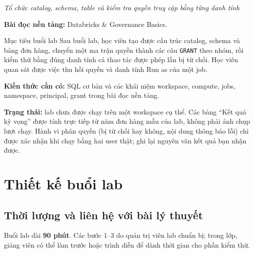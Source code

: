 
\begin{center}\large \emph{Tổ chức catalog, schema, table và kiểm tra quyền truy cập bằng từng danh tính}\end{center}

\textbf{Bài đọc nền tảng:} Databricks \& Governance Basics.


\begin{infobox}{Mục tiêu buổi lab}
Sau buổi lab, học viên tạo được cấu trúc catalog, schema và bảng đơn hàng, chuyển một ma trận quyền thành các câu \texttt{GRANT} theo nhóm, rồi kiểm thử bằng đúng danh tính cả thao tác được phép lẫn bị từ chối. Học viên quan sát được việc thu hồi quyền và danh tính Run as của một job.
\end{infobox}

\textbf{Kiến thức cần có:} SQL cơ bản và các khái niệm workspace, compute, jobs, namespace, principal, grant trong bài đọc nền tảng.


\begin{notebox}
\textbf{Trạng thái:} lab chưa được chạy trên một workspace cụ thể. Các bảng “Kết quả kỳ vọng” được tính trực tiếp từ năm đơn hàng mẫu của lab, không phải ảnh chụp lượt chạy. Hành vi phân quyền (bị từ chối hay không, nội dung thông báo lỗi) chỉ được xác nhận khi chạy bằng hai user thật; ghi lại nguyên văn kết quả bạn nhận được.
\end{notebox}

\tableofcontents
\clearpage

\section{Thiết kế buổi lab}

\subsection{Thời lượng và liên hệ với bài lý thuyết}

Buổi lab dài \textbf{90 phút}. Các bước 1--3 do quản trị viên lab chuẩn bị; trong lớp, giảng viên có thể làm trước hoặc trình diễn để dành thời gian cho phần kiểm thử.


